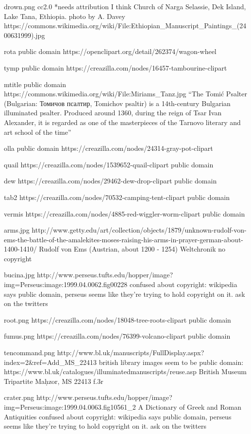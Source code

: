 drown.png
cc2.0 *needs attribution I think
Church of Narga Selassie, Dek Island, Lake Tana, Ethiopia.
photo by A. Davey
https://commons.wikimedia.org/wiki/File:Ethiopian_Manuscript_Paintings_(2400631999).jpg

rota
public domain
https://openclipart.org/detail/262374/wagon-wheel

tymp
public domain
https://creazilla.com/nodes/16457-tambourine-clipart

mtitle
public domain
https://commons.wikimedia.org/wiki/File:Miriams_Tanz.jpg
``The Tomić Psalter (Bulgarian: Томичов псалтир, Tomichov psaltir) is a 14th-century Bulgarian illuminated psalter. Produced around 1360, during the reign of Tsar Ivan Alexander, it is regarded as one of the masterpieces of the Tarnovo literary and art school of the time''

olla
public domain
https://creazilla.com/nodes/24314-gray-pot-clipart

quail
https://creazilla.com/nodes/1539652-quail-clipart
public domain

dew
https://creazilla.com/nodes/29462-dew-drop-clipart
public domain

tab2
https://creazilla.com/nodes/70532-camping-tent-clipart
public domain

vermis
https://creazilla.com/nodes/4885-red-wiggler-worm-clipart
public domain

arms.jpg
http://www.getty.edu/art/collection/objects/1879/unknown-rudolf-von-ems-the-battle-of-the-amalekites-moses-raising-his-arms-in-prayer-german-about-1400-1410/
Rudolf von Ems (Austrian, about 1200 - 1254)
Weltchronik
no copyright

bucina.jpg
http://www.perseus.tufts.edu/hopper/image?img=Perseus:image:1999.04.0062.fig00228
confused about copyright: wikipedia says public domain, perseus seems like they're trying to hold copyright on it.
ask on the twitters

root.png
https://creazilla.com/nodes/18048-tree-roots-clipart
public domain

fumus.png
https://creazilla.com/nodes/76399-volcano-clipart
public domain

tencommand.png
http://www.bl.uk/manuscripts/FullDisplay.aspx?index=2&ref=Add_MS_22413
british library images seem to be public domain: https://www.bl.uk/catalogues/illuminatedmanuscripts/reuse.asp
British Museum Tripartite Maḥzor, MS 22413 f.3r 

crater.png
http://www.perseus.tufts.edu/hopper/image?img=Perseus:image:1999.04.0063.fig10561_2
A Dictionary of Greek and Roman Antiquities
confused about copyright: wikipedia says public domain, perseus seems like they're trying to hold copyright on it.
ask on the twitters

